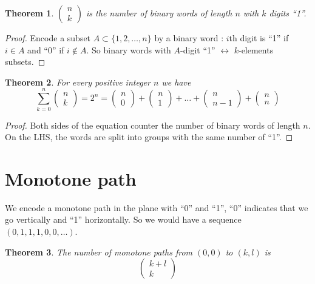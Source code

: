 \documentclass[a4paper,11pt]{report}
\newtheorem{theorem}{Theorem}
\begin{document}
\begin{theorem}
  $\begin{pmatrix} n \\ k\end{pmatrix}$ is the number of binary words of length
  $n$ with $k$ digits ``1''.
\end{theorem}

\begin{proof}
  Encode a subset $A \subset \{1,2,\dots,n\}$ by a binary word : $i$th digit is
  ``1'' if $i\in A$ and ``0'' if $i \not \in A$. So binary words with $A$-digit
  ``1'' $\leftrightarrow$ $k$-elements subsets.
\end{proof}

\begin{theorem}
  For every positive integer $n$ we have
  \[
    \sum_{k=0}^n \begin{pmatrix} n \\ k\end{pmatrix} = 2^n = \begin{pmatrix} n
      \\ 0\end{pmatrix} + \begin{pmatrix} n \\ 1\end{pmatrix} + \dots
    + \begin{pmatrix} n \\ n-1\end{pmatrix} + \begin{pmatrix} n \\ n\end{pmatrix}
  \]
\end{theorem}

\begin{proof}
  Both sides of the equation counter the number of binary words of length $n$.
  On the LHS, the words are split into groups with the same number of ``1''.
\end{proof}

\section{Monotone path}

We encode a monotone path in the plane with ``0'' and ``1'', ``0'' indicates
that we go vertically and ``1'' horizontally. So we would have a sequence
$(0,1,1,1,0,0,\dots)$.

\begin{theorem}
  The number of monotone paths from $(0,0)$ to $(k,l)$ is
  \[
    \begin{pmatrix} k+l \\ k\end{pmatrix}
  \]
\end{theorem}
\end{document}
